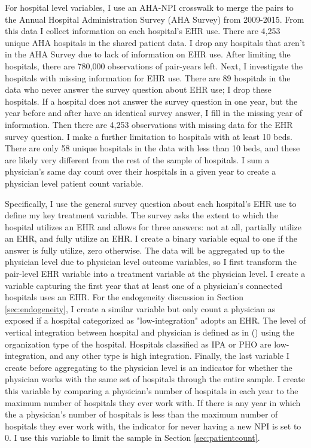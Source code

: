 \documentclass[12pt]{article}
\begin{document}
For hospital level variables, I use an AHA-NPI crosswalk to merge the pairs to the Annual Hospital Administration Survey (AHA Survey) from 2009-2015. From this data I collect information on each hospital's EHR use. There are 4,253 unique AHA hospitals in the shared patient data. I drop any hospitals that aren't in the AHA Survey due to lack of information on EHR use. After limiting the hospitals, there are 780,000 observations of pair-years left. Next, I investigate the hospitals with missing information for EHR use. There are 89 hospitals in the data who never answer the survey question about EHR use; I drop these hospitals. If a hospital does not answer the survey question in one year, but the year before and after have an identical survey answer, I fill in the missing year of information. Then there are 4,253 observations with missing data for the EHR survey question. I make a further limitation to hospitals with at least 10 beds. There are only 58 unique hospitals in the data with less than 10 beds, and these are likely very different from the rest of the sample of hospitals. I sum a physician's same day count over their hospitals in a given year to create a physician level patient count variable. 

Specifically, I use the general survey question about each hospital's EHR use to define my key treatment variable. The survey asks the extent to which the hospital utilizes an EHR and allows for three answers: not at all, partially utilize an EHR, and fully utilize an EHR. I create a binary variable equal to one if the answer is fully utilize, zero otherwise. The data will be aggregated up to the physician level due to physician level outcome variables, so I first transform the pair-level EHR variable into a treatment variable at the physician level. I create a variable capturing the first year that at least one of a physician's connected hospitals uses an EHR. For the endogeneity discussion in Section \ref{sec:endogeneity}, I create a similar variable but only count a physician as exposed if a hospital categorized as "low-integration" adopts an EHR. The level of vertical integration between hospital and physician is defined as in \citeauthor{dynan1998assessing} (\citeyear{dynan1998assessing}) using the organization type of the hospital. Hospitals classified as IPA or PHO are low-integration, and any other type is high integration. Finally, the last variable I create before aggregating to the physician level is an indicator for whether the physician works with the same set of hospitals through the entire sample. I create this variable by comparing a physician's number of hospitals in each year to the maximum number of hospitals they ever work with. If there is any year in which the a physician's number of hospitals is less than the maximum number of hospitals they ever work with, the indicator for never having a new NPI is set to 0. I use this variable to limit the sample in Section \ref{sec:patientcount}. 
\end{document}
